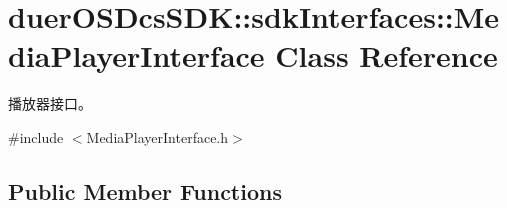 \hypertarget{classduerOSDcsSDK_1_1sdkInterfaces_1_1MediaPlayerInterface}{}\section{duer\+O\+S\+Dcs\+S\+DK\+:\+:sdk\+Interfaces\+:\+:Media\+Player\+Interface Class Reference}
\label{classduerOSDcsSDK_1_1sdkInterfaces_1_1MediaPlayerInterface}


播放器接口。  




{\ttfamily \#include $<$Media\+Player\+Interface.\+h$>$}

\subsection*{Public Member Functions}
